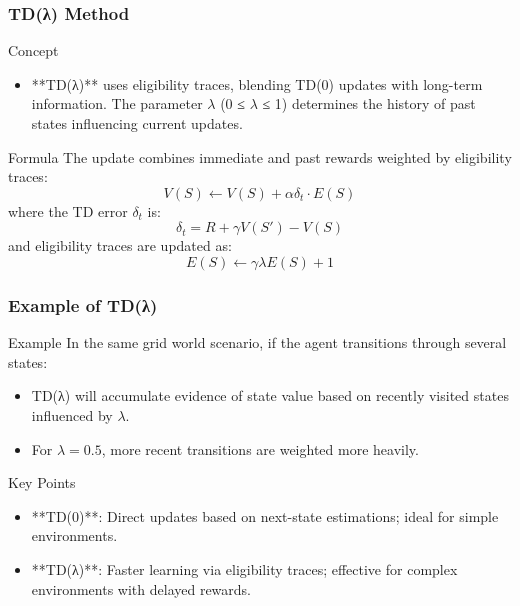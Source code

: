 \documentclass[aspectratio=169]{beamer}
\begin{document}
\begin{frame}[fragile]
    \frametitle{TD(λ) Method}
    \begin{block}{Concept}
        \begin{itemize}
            \item **TD(λ)** uses eligibility traces, blending TD(0) updates with long-term information. The parameter $\lambda$ (0 ≤ $\lambda$ ≤ 1) determines the history of past states influencing current updates.
        \end{itemize}
    \end{block}
    
    \begin{block}{Formula}
        The update combines immediate and past rewards weighted by eligibility traces:
        \[
        V(S) \leftarrow V(S) + \alpha \delta_t \cdot E(S)
        \]
        where the TD error $\delta_t$ is:
        \[
        \delta_t = R + \gamma V(S') - V(S)
        \]
        and eligibility traces are updated as:
        \[
        E(S) \leftarrow \gamma \lambda E(S) + 1
        \]
    \end{block}
\end{frame}

\begin{frame}[fragile]
    \frametitle{Example of TD(λ)}
    \begin{block}{Example}
        In the same grid world scenario, if the agent transitions through several states:
        \begin{itemize}
            \item TD(λ) will accumulate evidence of state value based on recently visited states influenced by $\lambda$.
            \item For $\lambda = 0.5$, more recent transitions are weighted more heavily.
        \end{itemize}
    \end{block}
    
    \begin{block}{Key Points}
        \begin{itemize}
            \item **TD(0)**: Direct updates based on next-state estimations; ideal for simple environments.
            \item **TD(λ)**: Faster learning via eligibility traces; effective for complex environments with delayed rewards.
        \end{itemize}
    \end{block}
\end{frame}
\end{document}
